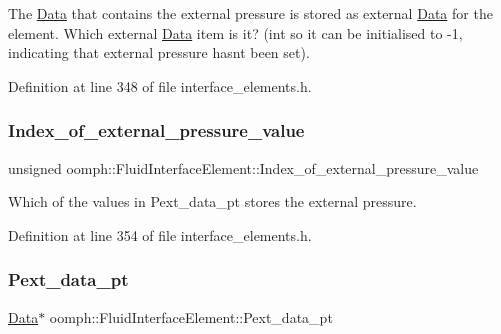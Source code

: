 The \hyperlink{classoomph_1_1Data}{Data} that contains the external pressure is stored as external \hyperlink{classoomph_1_1Data}{Data} for the element. Which external \hyperlink{classoomph_1_1Data}{Data} item is it? (int so it can be initialised to -\/1, indicating that external pressure hasn\textquotesingle{}t been set). 



Definition at line 348 of file interface\+\_\+elements.\+h.

\mbox{\label{classoomph_1_1FluidInterfaceElement_a2a49c97d42ce05d1876626e5918bb8eb}} 
\subsubsection{\texorpdfstring{Index\+\_\+of\+\_\+external\+\_\+pressure\+\_\+value}{Index\_of\_external\_pressure\_value}}
{\footnotesize\ttfamily unsigned oomph\+::\+Fluid\+Interface\+Element\+::\+Index\+\_\+of\+\_\+external\+\_\+pressure\+\_\+value\hspace{0.3cm}{\ttfamily [protected]}}



Which of the values in Pext\+\_\+data\+\_\+pt stores the external pressure. 



Definition at line 354 of file interface\+\_\+elements.\+h.

\mbox{\label{classoomph_1_1FluidInterfaceElement_a9177eb6e96e5ac13fe092596bc104910}} 
\subsubsection{\texorpdfstring{Pext\+\_\+data\+\_\+pt}{Pext\_data\_pt}}
{\footnotesize\ttfamily \hyperlink{classoomph_1_1Data}{Data}$\ast$ oomph\+::\+Fluid\+Interface\+Element\+::\+Pext\+\_\+data\+\_\+pt\hspace{0.3cm}{\ttfamily [protected]}}



